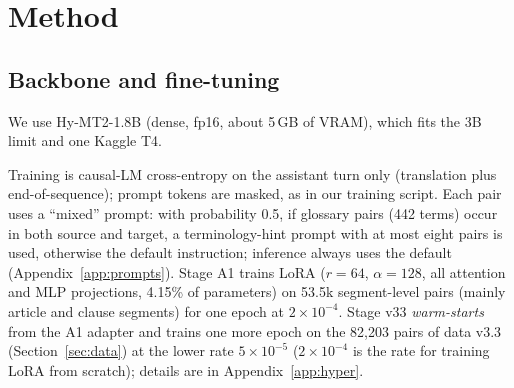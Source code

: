 \section{Method}
\label{sec:method}

\subsection{Backbone and fine-tuning}
We use Hy-MT2-1.8B \citep{zheng2026hymt2} (dense, fp16, about 5\,GB of VRAM), which fits the 3B limit and one Kaggle T4.

Training is causal-LM cross-entropy on the assistant turn only (translation plus end-of-sequence); prompt tokens are masked, as in our training script.
Each pair uses a ``mixed'' prompt: with probability 0.5, if glossary pairs (442 terms) occur in both source and target, a terminology-hint prompt with at most eight pairs is used, otherwise the default instruction; inference always uses the default (Appendix~\ref{app:prompts}).
Stage A1 trains LoRA \citep{hu2021lora} ($r{=}64$, $\alpha{=}128$, all attention and MLP projections, 4.15\% of parameters) on 53.5k segment-level pairs (mainly article and clause segments) for one epoch at $2\times10^{-4}$.
Stage v33 \emph{warm-starts} from the A1 adapter and trains one more epoch on the 82{,}203 pairs of data v3.3 (Section~\ref{sec:data}) at the lower rate $5\times10^{-5}$ ($2\times10^{-4}$ is the rate for training LoRA from scratch); details are in Appendix~\ref{app:hyper}.


